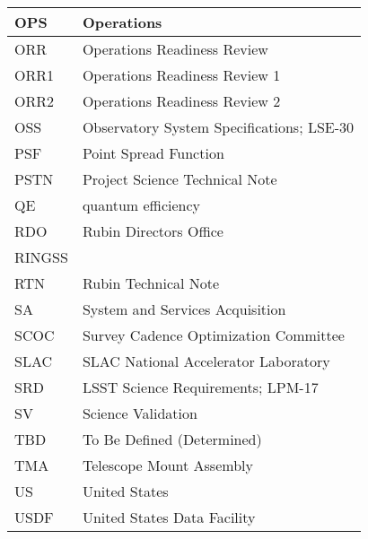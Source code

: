 \begin{longtable}{p{}p{}}
OPS & Operations \\\hline
ORR & Operations Readiness Review \\\hline
ORR1 & Operations Readiness Review 1 \\\hline
ORR2 & Operations Readiness Review 2 \\\hline
OSS & Observatory System Specifications; LSE-30 \\\hline
PSF & Point Spread Function \\\hline
PSTN & Project Science Technical Note \\\hline
QE & quantum efficiency \\\hline
RDO & Rubin Directors Office \\\hline
RINGSS &  \\\hline
RTN & Rubin Technical Note \\\hline
SA & System and Services Acquisition \\\hline
SCOC & Survey Cadence Optimization Committee \\\hline
SLAC & SLAC National Accelerator Laboratory \\\hline
SRD & LSST Science Requirements; LPM-17 \\\hline
SV & Science Validation \\\hline
TBD & To Be Defined (Determined) \\\hline
TMA & Telescope Mount Assembly \\\hline
US & United States \\\hline
USDF & United States Data Facility \\\hline
\end{longtable}
